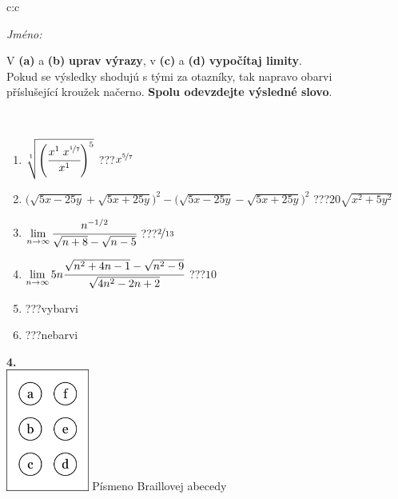 \documentclass[10pt]{report}
\begin{document}
\begin{tabular}{c:c}
\begin{minipage}[c][104.5mm][t]{0.5\linewidth}
\begin{center}
\textit{Jméno:}\phantom{xxxxxxxxxxxxxxxxxxxxxxxxxxxxxxxxxxxxxxxxxxxxxxxxxxxxxxxxxxxxxxxxx}\\[5mm]
\begin{minipage}{0.95\linewidth}
\begin{center}
V \textbf{(a)} a \textbf{(b)} \textbf{uprav výrazy}, v \textbf{(c)} a \textbf{(d)} \textbf{vypočítaj limity}.\\Pokud se výsledky shodujú s tými za otazníky, tak napravo obarvi\\příslušející kroužek načerno. \textbf{Spolu odevzdejte výsledné slovo}.
\end{center}
\end{minipage}
\\[1mm]
\begin{minipage}{0.79\linewidth}
\begin{center}
\begin{varwidth}{\linewidth}
\begin{enumerate}
\small
\item $\sqrt[1]{\left(\cfrac{x^{1}\;x^{\nicefrac{1}{7}}}{x^{1}}\right)^{5}}$\quad \dotfill\; ???\;\dotfill \quad $x^{\nicefrac{5}{7}}$
\item {\footnotesize{\scriptsize$\big(\sqrt{5x-25y}+\sqrt{5x+25y}\big)^2-\big(\sqrt{5x-25y}-\sqrt{5x+25y}\big)^2$}\quad \dotfill\; ???\;\dotfill \quad $20\sqrt{x^2+5y^2}$}
\item $\lim\limits_{n\to\infty}\cfrac{n^{-1/2}}{\sqrt{n+8}-\sqrt{n-5}}$\quad \dotfill\; ???\;\dotfill \quad $\nicefrac{2}{13}$
\item $\lim\limits_{n\to\infty}5n\cfrac{\sqrt{n^2+4n-1}-\sqrt{n^2-9}}{\sqrt{4n^2-2n+2}}$\quad \dotfill\; ???\;\dotfill \quad $10$
\item \quad \dotfill\; ???\;\dotfill \quad vybarvi
\item \quad \dotfill\; ???\;\dotfill \quad nebarvi
\end{enumerate}
\end{varwidth}
\end{center}
\end{minipage}
\begin{minipage}{0.20\linewidth}
\begin{center}
{\Huge\bfseries 4.} \\[2mm]
\includegraphics[height=40mm]{../images/braille.png}
{\small Písmeno Braillovej abecedy}
\end{center}
\end{minipage}
\end{center}
\end{minipage}
%
\end{tabular}
\end{document}
